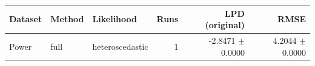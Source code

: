 \begin{tabular}{lllrrr}
\toprule
Dataset & Method & Likelihood & Runs & LPD (original) & RMSE \\
\midrule
Power & full & heteroscedastic & 1 & -2.8471 $\pm$ 0.0000 & 4.2044 $\pm$ 0.0000 \\
\bottomrule
\end{tabular}
